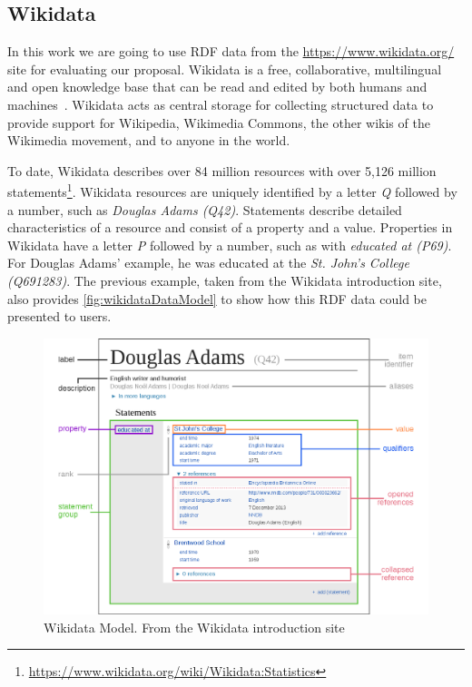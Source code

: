 
\subsection{Wikidata}

In this work we are going to use RDF data from the \url{https://www.wikidata.org/} site for evaluating our proposal. Wikidata is a free, collaborative, multilingual and open knowledge base that can be read and edited by both humans and machines~\cite{Wikidata2014}. Wikidata acts as central storage for collecting structured data to provide support for Wikipedia, Wikimedia Commons, the other wikis of the Wikimedia movement, and to anyone in the world.

To date, Wikidata describes over 84 million resources with over 5,126 million statements\footnote{\url{https://www.wikidata.org/wiki/Wikidata:Statistics}}. Wikidata resources are uniquely identified by a letter \textit{Q} followed by a number, such as \textit{Douglas Adams (Q42)}. Statements describe detailed characteristics of a resource and consist of a property and a value. Properties in Wikidata have a letter \textit{P} followed by a number, such as with \textit{educated at (P69)}. For Douglas Adams' example, he was educated at the \textit{St. John's College (Q691283)}. The previous example, taken from the Wikidata introduction site, also provides \autoref{fig:wikidataDataModel} to show how this RDF data could be presented to users.

\begin{figure}[h]
    \centering
        \includegraphics[width=\linewidth]{imagenes/Datamodel_in_Wikidata.png}
        \caption{Wikidata Model. From the Wikidata introduction site~\cite{WikidataIntroduction}}
        \label{fig:wikidataDataModel}
\end{figure}

